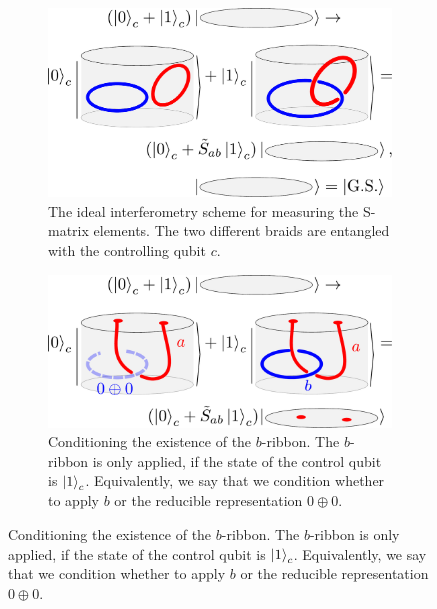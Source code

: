 \documentclass[two column]{article}
\begin{document}
\begin{figure}
\centering

\begin{subfigure}{0.47\textwidth}
    \includegraphics[width = \linewidth]{Figures/intef_example.pdf}
    \caption{The ideal interferometry scheme for measuring the S-matrix elements. The two different braids are entangled with the controlling qubit $c$.}
    \label{fig:intef_example}
\end{subfigure}\hfill
\begin{subfigure}{0.47\textwidth}
    \includegraphics[width=\linewidth]{Figures/intefEx.pdf}
    \caption{Conditioning the existence of the $b$-ribbon. The $b$-ribbon is only applied, if the state of the control qubit is $\ket{1}_c$. Equivalently, we say that we condition whether to apply $b$ or the reducible representation $0\oplus 0$.}
    \label{fig:cond_ex}
\end{subfigure}


\end{figure}
\end{document}
